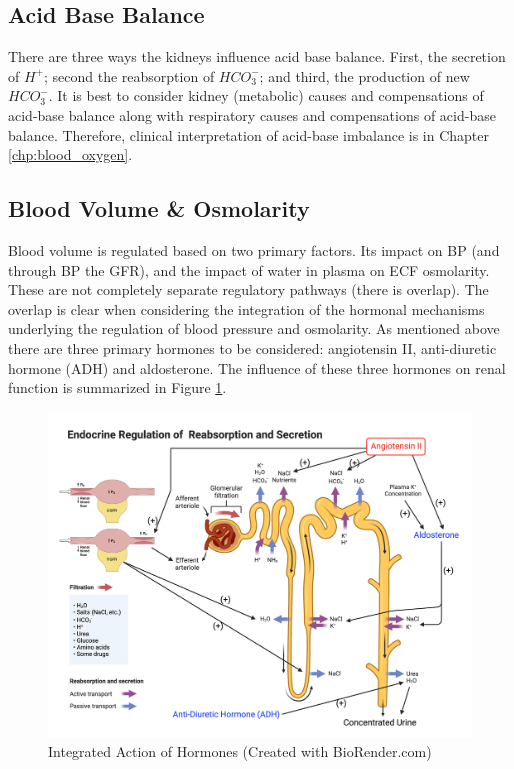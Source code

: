 \subsection{Acid Base Balance}
There are three ways the kidneys influence acid base balance. First, the secretion of $H^+$; second the reabsorption of $HCO_3^-$; and third, the production of new $HCO_3^-$. It is best to consider kidney (metabolic) causes and compensations of acid-base balance along with respiratory causes and compensations of acid-base balance. Therefore, clinical interpretation of acid-base imbalance is in Chapter \ref{chp:blood_oxygen}.


\subsection{Blood Volume \& Osmolarity}

Blood volume is regulated based on two primary factors. Its impact on BP (and through BP the GFR), and the impact of water in plasma on ECF osmolarity. These are not completely separate regulatory pathways (there is overlap). The overlap is clear when considering the integration of the hormonal mechanisms underlying the regulation of blood pressure and osmolarity. As mentioned above there are three primary hormones to be considered: angiotensin II, anti-diuretic hormone (ADH) and aldosterone. The influence of these three hormones on renal function is summarized in Figure \ref{fig:Endocrine_Regulation}.

\begin{figure}[!h]
    \centering
    \includegraphics[width=1\linewidth]{./figure/Endocrine_Regulation.png}
    \caption{Integrated Action of Hormones \footnotesize{(Created with BioRender.com)}}
    \label{fig:Endocrine_Regulation}
\end{figure}

